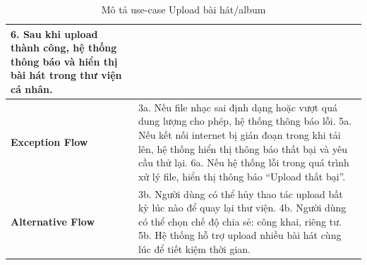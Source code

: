 \documentclass[a4paper]{article}
\begin{document}
\begin{table}[H]
\begin{tabularx}{\textwidth}{|l|X|}
		6. Sau khi upload thành công, hệ thống thông báo và hiển thị bài hát trong thư viện cá nhân.                                                                              \\ \hline
		\textbf{Exception Flow}
		                       & 3a. Nếu file nhạc sai định dạng hoặc vượt quá dung lượng cho phép, hệ thống thông báo lỗi. \newline
		5a. Nếu kết nối internet bị gián đoạn trong khi tải lên, hệ thống hiển thị thông báo thất bại và yêu cầu thử lại. \newline
		6a. Nếu hệ thống lỗi trong quá trình xử lý file, hiển thị thông báo “Upload thất bại”.                                                                                    \\ \hline
		\textbf{Alternative Flow}
		                       & 3b. Người dùng có thể hủy thao tác upload bất kỳ lúc nào để quay lại thư viện. \newline
		4b. Người dùng có thể chọn chế độ chia sẻ: công khai, riêng tư. \newline
		5b. Hệ thống hỗ trợ upload nhiều bài hát cùng lúc để tiết kiệm thời gian.                                                                                                 \\ \hline
	\end{tabularx}
	\caption{Mô tả use-case Upload bài hát/album}
\end{table}

\end{document}
